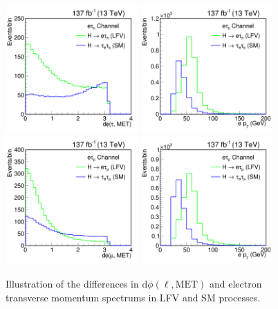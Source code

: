 \begin{figure}[htbp]
  \centering
  \includegraphics[width=0.45\textwidth]{plots/chapter6/LFVvSM/ETdphi.png}
  \includegraphics[width=0.45\textwidth]{plots/chapter6/LFVvSM/ETept.png} \\
  \includegraphics[width=0.45\textwidth]{plots/chapter6/LFVvSM/EMdphi.png}
  \includegraphics[width=0.45\textwidth]{plots/chapter6/LFVvSM/EMept.png} \\
  \caption{Illustration of the differences in $\text{d}\phi(\ell, \text{MET})$ and electron transverse momentum spectrums in LFV and SM \Htt processes.}
  \label{fig:htt_v_lfv_et}
\end{figure}

